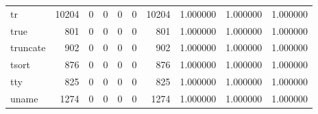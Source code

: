 \begin{tabular}{lrrrrrrrrr}
tr        &                               10204 &                                               0 &                                              0 &                                             0 &                                              0 &                                        10204 &                                           1.000000 &                               1.000000 &                             1.000000 \\
true      &                                 801 &                                               0 &                                              0 &                                             0 &                                              0 &                                          801 &                                           1.000000 &                               1.000000 &                             1.000000 \\
truncate  &                                 902 &                                               0 &                                              0 &                                             0 &                                              0 &                                          902 &                                           1.000000 &                               1.000000 &                             1.000000 \\
tsort     &                                 876 &                                               0 &                                              0 &                                             0 &                                              0 &                                          876 &                                           1.000000 &                               1.000000 &                             1.000000 \\
tty       &                                 825 &                                               0 &                                              0 &                                             0 &                                              0 &                                          825 &                                           1.000000 &                               1.000000 &                             1.000000 \\
uname     &                                1274 &                                               0 &                                              0 &                                             0 &                                              0 &                                         1274 &                                           1.000000 &                               1.000000 &                             1.000000 \\

\end{tabular}
